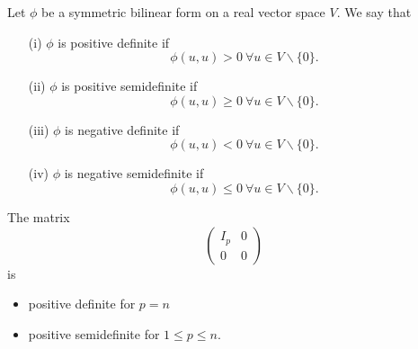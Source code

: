 \documentclass[a4paper]{scrartcl}
\begin{document}
\begin{definition}
     Let $\phi$ be a symmetric bilinear form on a real vector space $V$. We say that 
     \begin{itemize}
         \item[(i)] $\phi$ is positive definite if 
         \[\phi (u,u) >0 \ \forall u \in V \backslash \{0\}.\]
         \item[(ii)] $\phi$ is positive semidefinite if 
         \[\phi (u,u) \geq 0 \ \forall u \in V \backslash \{0\}.\]
         \item[(iii)] $\phi$ is negative definite if 
         \[\phi (u,u) <0 \ \forall u \in V \backslash \{0\}.\]
         \item[(iv)] $\phi$ is negative semidefinite if 
         \[\phi (u,u) \leq 0 \ \forall u \in V \backslash \{0\}.\]
     \end{itemize}
\end{definition}
\begin{example}
     The matrix 
     \[\left(
     \begin{array}{c|c}
          I_p &0\\
          \hline
          0&0
     \end{array}
     \right)
     \]
     is
     \begin{itemize}
         \item positive definite for $p=n$
         \item positive semidefinite for $1 \leq p \leq n$.
     \end{itemize}
\end{example}
\end{document}
